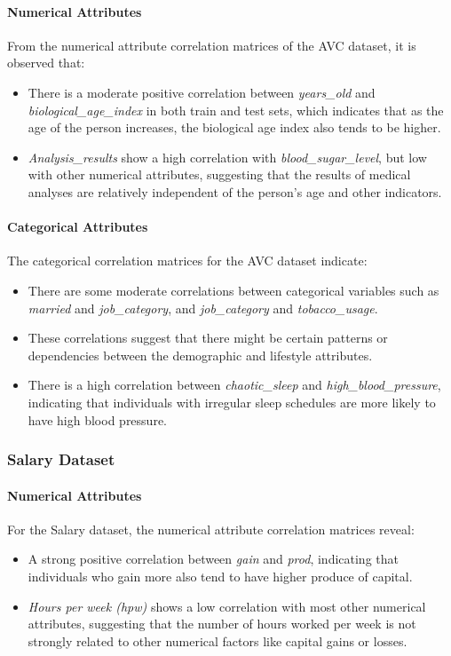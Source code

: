 \documentclass[a4paper,12pt]{article}
\begin{document}
\paragraph{Numerical Attributes}
From the numerical attribute correlation matrices of the AVC dataset, it is observed that:
\begin{itemize}
    \item There is a moderate positive correlation between \textit{years\_old} and \textit{biological\_age\_index} in both train and test sets, which indicates that as the age of the person increases, the biological age index also tends to be higher.
    \item \textit{Analysis\_results} show a high correlation with \textit{blood\_sugar\_level}, but low with other numerical attributes, suggesting that the results of medical analyses are relatively independent of the person's age and other indicators.
\end{itemize}

\paragraph{Categorical Attributes}
The categorical correlation matrices for the AVC dataset indicate:
\begin{itemize}
    \item There are some moderate correlations between categorical variables such as \textit{married} and \textit{job\_category}, and \textit{job\_category} and \textit{tobacco\_usage}.
    \item These correlations suggest that there might be certain patterns or dependencies between the demographic and lifestyle attributes.
    \item There is a high correlation between \textit{chaotic\_sleep} and \textit{high\_blood\_pressure}, indicating that individuals with irregular sleep schedules are more likely to have high blood pressure.
\end{itemize}

\subsubsection{Salary Dataset}
\paragraph{Numerical Attributes}
For the Salary dataset, the numerical attribute correlation matrices reveal:
\begin{itemize}
    \item A strong positive correlation between \textit{gain} and \textit{prod}, indicating that individuals who gain more also tend to have higher produce of capital.
    \item \textit{Hours per week (hpw)} shows a low correlation with most other numerical attributes, suggesting that the number of hours worked per week is not strongly related to other numerical factors like capital gains or losses.
\end{itemize}
\end{document}

